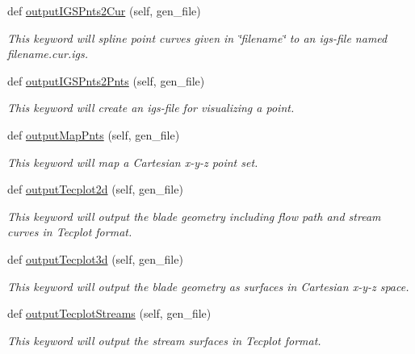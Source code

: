 \begin{DoxyCompactItemize}
def \hyperlink{classbladepro__modules_1_1inputfile__writer_1_1_input_writer_window_a60dc6e0ccec5f096ee68f997079abef3}{output\+I\+G\+S\+Pnts2\+Cur} (self, gen\+\_\+file)
\begin{DoxyCompactList}\small\item\em This keyword will spline point curves given in \char`\"{}filename\char`\"{} to an igs-\/file named filename.\+cur.\+igs. \end{DoxyCompactList}\item 
def \hyperlink{classbladepro__modules_1_1inputfile__writer_1_1_input_writer_window_a07862d0aa6332b54008342a24c2e30a3}{output\+I\+G\+S\+Pnts2\+Pnts} (self, gen\+\_\+file)
\begin{DoxyCompactList}\small\item\em This keyword will create an igs-\/file for visualizing a point. \end{DoxyCompactList}\item 
def \hyperlink{classbladepro__modules_1_1inputfile__writer_1_1_input_writer_window_abfeabe3a35852a2ce2ddf16765aef7eb}{output\+Map\+Pnts} (self, gen\+\_\+file)
\begin{DoxyCompactList}\small\item\em This keyword will map a Cartesian x-\/y-\/z point set. \end{DoxyCompactList}\item 
def \hyperlink{classbladepro__modules_1_1inputfile__writer_1_1_input_writer_window_a63d4bad24ed0fab617c1676db04a67e7}{output\+Tecplot2d} (self, gen\+\_\+file)
\begin{DoxyCompactList}\small\item\em This keyword will output the blade geometry including flow path and stream curves in Tecplot format. \end{DoxyCompactList}\item 
def \hyperlink{classbladepro__modules_1_1inputfile__writer_1_1_input_writer_window_a33919a9fe9364387c8f96fa21c35d2e8}{output\+Tecplot3d} (self, gen\+\_\+file)
\begin{DoxyCompactList}\small\item\em This keyword will output the blade geometry as surfaces in Cartesian x-\/y-\/z space. \end{DoxyCompactList}\item 
def \hyperlink{classbladepro__modules_1_1inputfile__writer_1_1_input_writer_window_adb8d68c4190d41bd93a2988562f6495b}{output\+Tecplot\+Streams} (self, gen\+\_\+file)
\begin{DoxyCompactList}\small\item\em This keyword will output the stream surfaces in Tecplot format. \end{DoxyCompactList}\item 

\end{DoxyCompactItemize}

